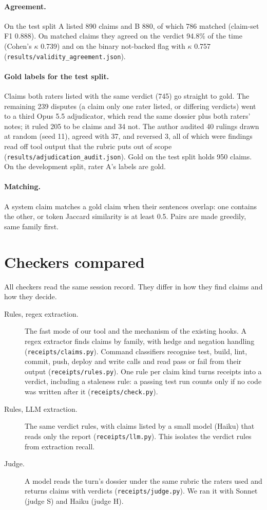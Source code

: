 \documentclass[11pt]{article}
\begin{document}
\paragraph{Agreement.} On the test split A listed 890 claims and B 880, of which 786 matched (claim-set F1
0.888). On matched claims they agreed on the verdict 94.8\% of the time (Cohen's $\kappa$ 0.739) and on the
binary not-backed flag with $\kappa$ 0.757 (\texttt{results/validity\_agreement.json}).

\paragraph{Gold labels for the test split.} Claims both raters listed with the same verdict (745) go straight to
gold. The remaining 239 disputes (a claim only one rater listed, or differing verdicts) went to a third Opus 5.5
adjudicator, which read the same dossier plus both raters' notes; it ruled 205 to be claims and 34 not. The author
audited 40 rulings drawn at random (seed 11), agreed with 37, and reversed 3, all of which were findings read
off tool output that the rubric puts out of scope (\texttt{results/adjudication\_audit.json}). Gold on the test
split holds 950 claims. On the development split, rater A's labels are gold.

\paragraph{Matching.} A system claim matches a gold claim when their sentences overlap: one contains the other,
or token Jaccard similarity is at least 0.5. Pairs are made greedily, same family first.

\section{Checkers compared}

All checkers read the same session record. They differ in how they find claims and how they decide.

\begin{description}
\item[Rules, regex extraction.] The fast mode of our tool and the mechanism of the existing hooks. A regex
extractor finds claims by family, with hedge and negation handling (\texttt{receipts/claims.py}). Command
classifiers recognise test, build, lint, commit, push, deploy and write calls and read pass or fail from their
output (\texttt{receipts/rules.py}). One rule per claim kind turns receipts into a verdict, including a
staleness rule: a passing test run counts only if no code was written after it (\texttt{receipts/check.py}).
\item[Rules, LLM extraction.] The same verdict rules, with claims listed by a small model (Haiku) that reads
only the report (\texttt{receipts/llm.py}). This isolates the verdict rules from extraction recall.
\item[Judge.] A model reads the turn's dossier under the same rubric the raters used and returns claims with
verdicts (\texttt{receipts/judge.py}). We ran it with Sonnet (judge S) and Haiku (judge H).
\end{description}
\end{document}
